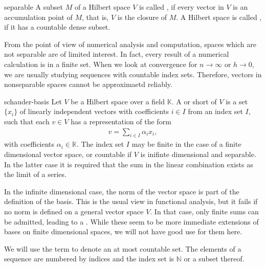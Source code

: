\begin{Definition}{separable}
  A subset $M$ of a Hilbert space $V$ is called , if
  every vector in $V$ is an accumulation point of $M$, that is, $V$ is
  the closure of $M$.  A Hilbert space is called ,
  if it has a countable dense subset.
\end{Definition}

\begin{remark}
  From the point of view of numerical analysis and computation, spaces
  which are not separable are of limited interest. In fact, every
  result of a numerical calculation is in a finite set. When we look
  at convergence for $n\to\infty$ or $h\to 0$, we are usually studying
  sequences with countable index sets. Therefore, vectors in
  nonseparable spaces cannot be approximaetd reliably.
\end{remark}

\begin{Definition}{schauder-basis}
  Let $V$ be a Hilbert space over a field $\mathbb K$. A
   or short  of $V$ is a set
  $\{x_i\}$ of linearly independent vectors with coefficients $i\in I$
  from an index set $I$, such that each $v\in V$ has a representation
  of the form
  \begin{gather*}
    v = \sum_{i\in I} \alpha_i x_i,
  \end{gather*}
  with coefficients $\alpha_i \in \mathbb K$. The index set $I$ may be
  finite in the case of a finite dimensional vector space, or
  countable if $V$ is inifinte dimensional and separable. In the
  latter case it is required that the sum in the linear combination
  exists as the limit of a series.
\end{Definition}

\begin{remark}
  In the infinite dimensional case, the norm of the vector space is
  part of the definition of the basis. This is the usual view in
  functional analysis, but it fails if no norm is defined on a general
  vector space $V$. In that case, only finite sums can be admitted,
  leading to a . While these seem to be more
  immediate extensions of bases on finite dimensional spaces, we will
  not have good use for them here.
\end{remark}

\begin{notation}
  We will use the term  to denote an at most
  countable set. The elements of a sequence are numbered by indices
  and the index set is $\mathbb N$ or a subset thereof.
\end{notation}


